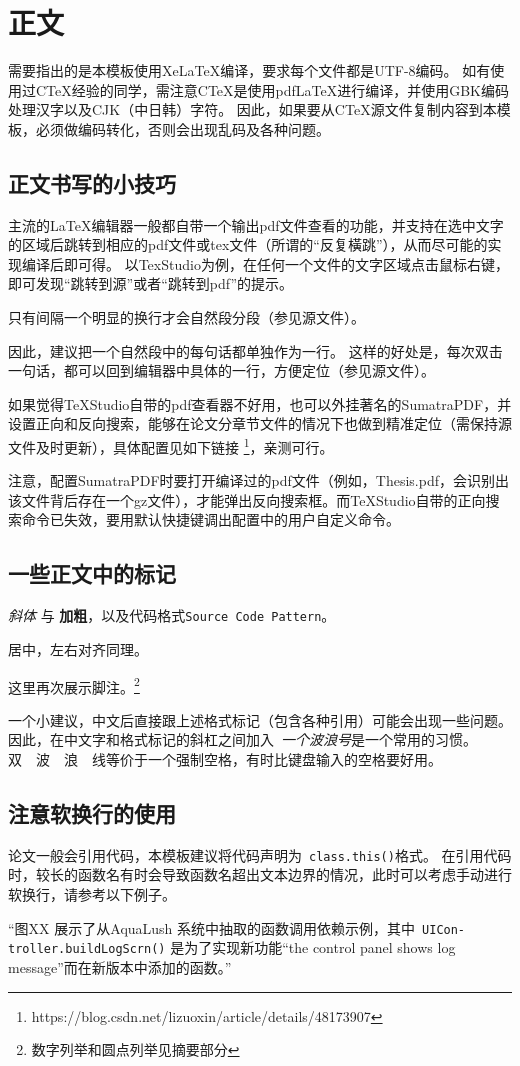 \chapter{正文}

需要指出的是本模板使用XeLaTeX编译，要求每个文件都是UTF-8编码。
如有使用过CTeX经验的同学，需注意CTeX是使用pdfLaTeX进行编译，并使用GBK编码处理汉字以及CJK（中日韩）字符。
因此，如果要从CTeX源文件复制内容到本模板，必须做编码转化，否则会出现乱码及各种问题。

\section{正文书写的小技巧}
主流的LaTeX编辑器一般都自带一个输出pdf文件查看的功能，并支持在选中文字的区域后跳转到相应的pdf文件或tex文件（所谓的“反复橫跳”），从而尽可能的实现编译后即可得。
以TexStudio为例，在任何一个文件的文字区域点击鼠标右键，即可发现“跳转到源”或者“跳转到pdf”的提示。

只有间隔一个明显的换行才会自然段分段（参见源文件）。

因此，建议把一个自然段中的每句话都单独作为一行。
这样的好处是，每次双击一句话，都可以回到编辑器中具体的一行，方便定位（参见源文件）。

如果觉得TeXStudio自带的pdf查看器不好用，也可以外挂著名的SumatraPDF，并设置正向和反向搜索，能够在论文分章节文件的情况下也做到精准定位（需保持源文件及时更新），具体配置见如下链接 \footnote{https://blog.csdn.net/lizuoxin/article/details/48173907}，亲测可行。

注意，配置SumatraPDF时要打开编译过的pdf文件（例如，Thesis.pdf，会识别出该文件背后存在一个gz文件），才能弹出反向搜索框。而TeXStudio自带的正向搜索命令已失效，要用默认快捷键调出配置中的用户自定义命令。

\section{一些正文中的标记}
\emph{斜体} 与 \textbf{加粗}，以及代码格式\texttt{Source Code Pattern}。

\begin{center}
居中，左右对齐同理。
\end{center}

这里再次展示脚注。\footnote{数字列举和圆点列举见摘要部分}

一个小建议，中文后直接跟上述格式标记（包含各种引用）可能会出现一些问题。
因此，在中文字和格式标记的斜杠之间加入~\emph{一个波浪号}是一个常用的习惯。
双~~波~~浪~~线等价于一个强制空格，有时比键盘输入的空格要好用。


\section{注意软换行的使用}
论文一般会引用代码，本模板建议将代码声明为~\texttt{class.this()}格式。
在引用代码时，较长的函数名有时会导致函数名超出文本边界的情况，此时可以考虑手动进行软换行，请参考以下例子。

“图XX 展示了从AquaLush 系统中抽取的函数调用依赖示例，其中~\texttt{UICon-} \linebreak \texttt{troller.buildLogScrn()} 是为了实现新功能“the control panel shows log message”而在新版本中添加的函数。”

